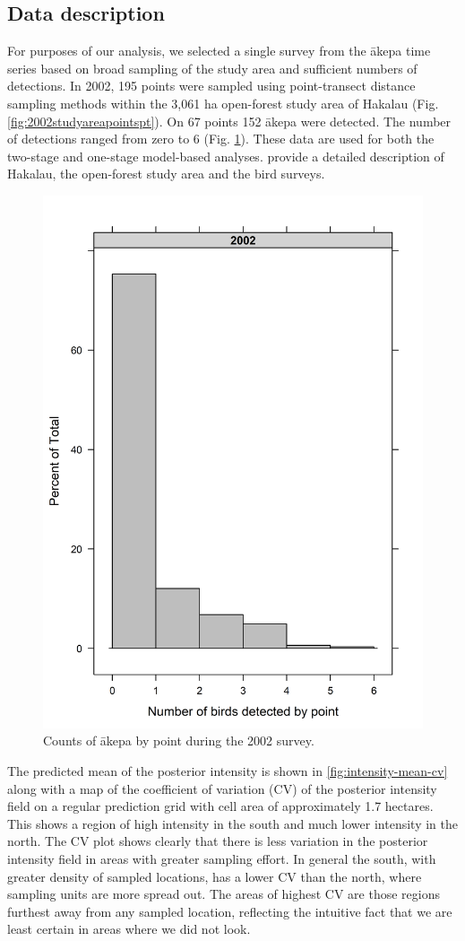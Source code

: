 \documentclass[preprint,12pt]{elsarticle}
\newcommand{\akepa}{\textquotesingle\={a}kepa}  %
\begin{document}
\subsection*{Data description}
For purposes of our analysis, we selected a single survey from the \akepa{} time series based on broad sampling of the study area and sufficient numbers of detections. In 2002, 195 points were sampled using point-transect distance sampling methods within the 3,061 ha open-forest study area of Hakalau (Fig. \ref{fig:2002studyareapointspt}). On 67 points 152 \akepa{} were detected. The number of detections ranged from zero to 6 (Fig. \ref{fig:2002countspt}). These data are used for both the two-stage and one-stage model-based analyses. \cite{camp_population_2010,camp_statespace_2016} provide a detailed description of Hakalau, the open-forest study area and the bird surveys.

\begin{figure}
	\centering
	\includegraphics[width=0.7\linewidth]{figures/2002counts_pt}
	\caption{Counts of \akepa{} by point during the 2002 survey.}
	\label{fig:2002countspt}
\end{figure}


The predicted mean of the posterior intensity is shown in \autoref{fig:intensity-mean-cv} along with a map of the coefficient of variation (CV) of the posterior intensity field on a regular prediction grid with cell area of approximately 1.7 hectares.  This shows a region of high intensity in the south and much lower intensity in the north.  The CV plot shows clearly that there is less variation in the posterior intensity field in areas with greater sampling effort.  In general the south, with greater density of sampled locations, has a lower CV than the north, where sampling units are more spread out.  The areas of highest CV are those regions furthest away from any sampled location, reflecting the intuitive fact that we are least certain in areas where we did not look.
\end{document}
